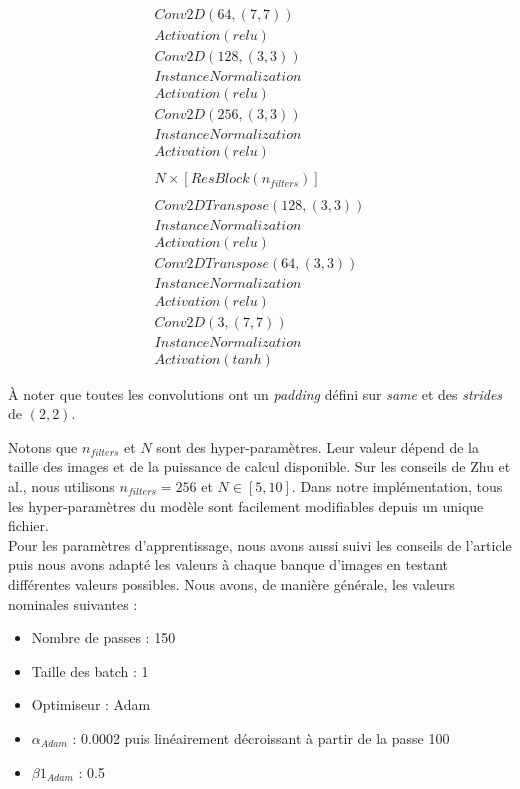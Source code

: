 \[ \begin{array}{lcr}
Conv2D(64, (7,7)) \\
Activation(relu) \\

Conv2D(128, (3,3)) \\
InstanceNormalization\\
Activation(relu)\\

Conv2D(256, (3,3)) \\
InstanceNormalization\\
Activation(relu)\\\\

N \times [ResBlock(n_{filters})]\\\\

Conv2DTranspose(128, (3,3)) \\
InstanceNormalization\\
Activation(relu)\\

Conv2DTranspose(64, (3,3)) \\
InstanceNormalization\\
Activation(relu)\\

Conv2D(3, (7,7)) \\
InstanceNormalization\\

Activation(tanh) \end{array}\]

À noter que toutes les convolutions ont un \textit{padding} défini sur \textit{same} et des \textit{strides} de $(2, 2)$.

Notons que $n_{filters}$ et $N$ sont des hyper-paramètres. Leur valeur dépend de la taille des images et de la puissance de calcul disponible. Sur les conseils de Zhu et al., nous utilisons $n_{filters} = 256$ et $N \in [5, 10]$. Dans notre implémentation, tous les hyper-paramètres du modèle sont facilement modifiables depuis un unique fichier. \\


Pour les paramètres d'apprentissage, nous avons aussi suivi les conseils de l'article puis nous avons adapté les valeurs à chaque banque d'images en testant différentes valeurs possibles. Nous avons, de manière générale, les valeurs nominales suivantes : \\

\begin{itemize}
  \item Nombre de passes : 150
  \item Taille des batch : 1
  \item Optimiseur : Adam
  \item $\alpha_{Adam}$ : 0.0002 puis linéairement décroissant à partir de la passe 100
  \item $\beta1_{Adam}$ : 0.5\\
\end{itemize}

